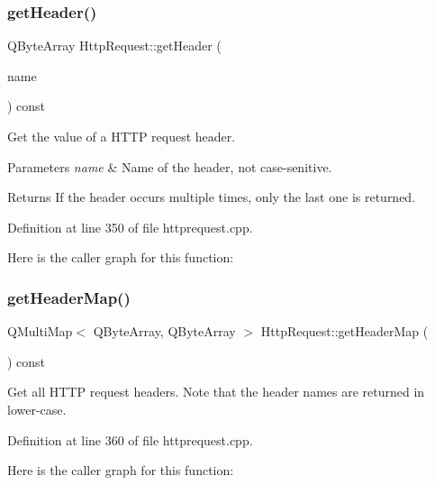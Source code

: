 \subsubsection{\texorpdfstring{get\+Header()}{getHeader()}}
{\footnotesize\ttfamily Q\+Byte\+Array Http\+Request\+::get\+Header (\begin{DoxyParamCaption}\item[{const Q\+Byte\+Array \&}]{name }\end{DoxyParamCaption}) const}

Get the value of a H\+T\+TP request header. 
\begin{DoxyParams}{Parameters}
{\em name} & Name of the header, not case-\/senitive. \\
\hline
\end{DoxyParams}
\begin{DoxyReturn}{Returns}
If the header occurs multiple times, only the last one is returned. 
\end{DoxyReturn}


Definition at line 350 of file httprequest.\+cpp.

Here is the caller graph for this function\+:
\mbox{\label{classstefanfrings_1_1_http_request_a14a7f04cbe53ffc8d54c9b21fbd55704}} 
\subsubsection{\texorpdfstring{get\+Header\+Map()}{getHeaderMap()}}
{\footnotesize\ttfamily Q\+Multi\+Map$<$ Q\+Byte\+Array, Q\+Byte\+Array $>$ Http\+Request\+::get\+Header\+Map (\begin{DoxyParamCaption}{ }\end{DoxyParamCaption}) const}

Get all H\+T\+TP request headers. Note that the header names are returned in lower-\/case. 

Definition at line 360 of file httprequest.\+cpp.

Here is the caller graph for this function\+:
\mbox{\label{classstefanfrings_1_1_http_request_ac59f41dbdc579cc1827427d6e77303af}} 
